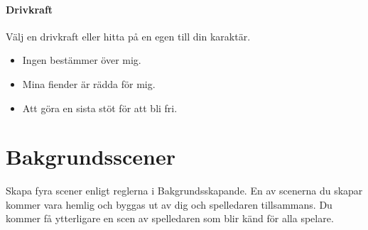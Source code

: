 \documentclass[a5paper,10pt]{article}
\begin{document}
\subsection{Drivkraft}
Välj en drivkraft eller hitta på en egen till din karaktär.
\begin{itemize}
  \item Ingen bestämmer över mig.
  \item Mina fiender är rädda för mig.
  \item Att göra en sista stöt för att bli fri.
\end{itemize}
\clearpage
\part{Bakgrundsscener}
Skapa fyra scener enligt reglerna i Bakgrundsskapande. En av scenerna du skapar kommer vara hemlig och byggas ut av dig och spelledaren tillsammans. Du kommer få ytterligare en scen av spelledaren som blir känd för alla spelare.


\clearpage

\end{document}
